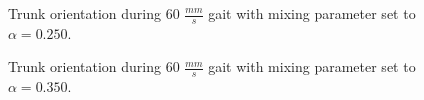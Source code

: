 				\begin{figure}
					\centering
					\caption{Trunk orientation during 60 $\frac{mm}{s}$ gait with mixing parameter set to $\alpha = 0.250$.}
					\label{fig::narx60_a250_nne}
				\end{figure}
				\begin{figure}
					\centering
					\caption{Trunk orientation during 60 $\frac{mm}{s}$ gait with mixing parameter set to $\alpha = 0.350$.}
					\label{fig::narx60_a350_nne}
				\end{figure}
